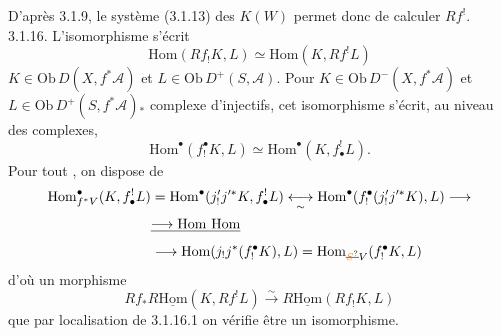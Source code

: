 D'après 3.1.9, le système (3.1.13) des $K(W)$ permet donc de calculer $Rf^!$.
3.1.16. L'isomorphisme  s'écrit
\[
 \mathrm{Hom}(Rf_!K,L)\simeq\mathrm{Hom}(K,Rf^!L)
 \tag*{(3.1.16.1)}
\]
 \deleted{\{} $K\in\mathrm{Ob}\,D(X,f^*\mathcal A)$ et $L\in\mathrm{Ob}\,D^+(S,\mathcal A)$. \deleted{\}} Pour $K\in\mathrm{Ob}\,D^-(X,f^*\mathcal A)$ et $L\in\mathrm{Ob}\,D^+(S,f^*\mathcal A)$\ensuremath{{}_{*}}  complexe d'injectifs, cet isomorphisme s'écrit, au niveau des complexes,
\[
 \mathrm{Hom}^\bullet(f_!^\bullet K,L)\simeq
 \mathrm{Hom}^\bullet(K,f_\bullet^!L).
\]
Pour tout , on dispose de
\[
\begin{aligned}
 \mathrm{Hom}_{f^*V}^\bullet(K,f_\bullet^!L)
 &=\mathrm{Hom}^\bullet(j'_!j'^*K,f_\bullet^!L)
 \underset{\sim}{\longleftrightarrow}\mathrm{Hom}^\bullet(f_!^\bullet(j'_!j'^*K),L)\longrightarrow\\
 &\deleted{\longrightarrow\mathrm{Hom}\ \mathrm{Hom}}\\
 &\longrightarrow\mathrm{Hom}(j_!j^*(f_!^\bullet K),L)
 =\mathrm{Hom}_{\deleted{\unsure{S}}V}(f_!^\bullet K,L)
\end{aligned}
\]
d'où un morphisme
\[
 Rf_*R\underline{\mathrm{Hom}}(K,Rf^!L)\xrightarrow{\sim}
 R\underline{\mathrm{Hom}}(Rf_!K,L)
 \tag*{(3.1.16.2)}
\]
que par localisation de 3.1.16.1 on vérifie être un isomorphisme.

